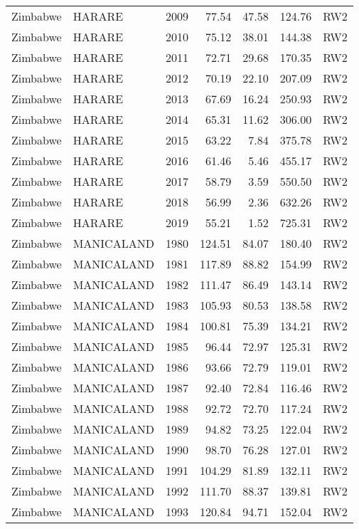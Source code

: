 \begin{longtable}{lllrrrl}
  Zimbabwe & HARARE & 2009 & 77.54 & 47.58 & 124.76 & RW2 \\ 
  Zimbabwe & HARARE & 2010 & 75.12 & 38.01 & 144.38 & RW2 \\ 
  Zimbabwe & HARARE & 2011 & 72.71 & 29.68 & 170.35 & RW2 \\ 
  Zimbabwe & HARARE & 2012 & 70.19 & 22.10 & 207.09 & RW2 \\ 
  Zimbabwe & HARARE & 2013 & 67.69 & 16.24 & 250.93 & RW2 \\ 
  Zimbabwe & HARARE & 2014 & 65.31 & 11.62 & 306.00 & RW2 \\ 
  Zimbabwe & HARARE & 2015 & 63.22 & 7.84 & 375.78 & RW2 \\ 
  Zimbabwe & HARARE & 2016 & 61.46 & 5.46 & 455.17 & RW2 \\ 
  Zimbabwe & HARARE & 2017 & 58.79 & 3.59 & 550.50 & RW2 \\ 
  Zimbabwe & HARARE & 2018 & 56.99 & 2.36 & 632.26 & RW2 \\ 
  Zimbabwe & HARARE & 2019 & 55.21 & 1.52 & 725.31 & RW2 \\ 
  Zimbabwe & MANICALAND & 1980 & 124.51 & 84.07 & 180.40 & RW2 \\ 
  Zimbabwe & MANICALAND & 1981 & 117.89 & 88.82 & 154.99 & RW2 \\ 
  Zimbabwe & MANICALAND & 1982 & 111.47 & 86.49 & 143.14 & RW2 \\ 
  Zimbabwe & MANICALAND & 1983 & 105.93 & 80.53 & 138.58 & RW2 \\ 
  Zimbabwe & MANICALAND & 1984 & 100.81 & 75.39 & 134.21 & RW2 \\ 
  Zimbabwe & MANICALAND & 1985 & 96.44 & 72.97 & 125.31 & RW2 \\ 
  Zimbabwe & MANICALAND & 1986 & 93.66 & 72.79 & 119.01 & RW2 \\ 
  Zimbabwe & MANICALAND & 1987 & 92.40 & 72.84 & 116.46 & RW2 \\ 
  Zimbabwe & MANICALAND & 1988 & 92.72 & 72.70 & 117.24 & RW2 \\ 
  Zimbabwe & MANICALAND & 1989 & 94.82 & 73.25 & 122.04 & RW2 \\ 
  Zimbabwe & MANICALAND & 1990 & 98.70 & 76.28 & 127.01 & RW2 \\ 
  Zimbabwe & MANICALAND & 1991 & 104.29 & 81.89 & 132.11 & RW2 \\ 
  Zimbabwe & MANICALAND & 1992 & 111.70 & 88.37 & 139.81 & RW2 \\ 
  Zimbabwe & MANICALAND & 1993 & 120.84 & 94.71 & 152.04 & RW2 \\ 

\end{longtable}
